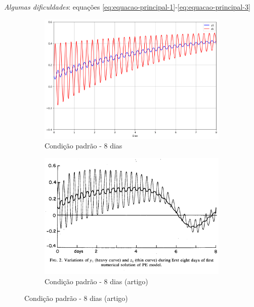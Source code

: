 \begin{frame}{\textit{Algumas dificuldades}: equações \eqref{eq:equacao-principal-1}-\eqref{eq:equacao-principal-3}}
	\begin{figure}
		\centering
		\begin{subfigure}[b]{0.45\textwidth}
			\centering
			\includegraphics[width=\textwidth]{img/p01d08.png}
			\caption{Condição padrão - 8 dias}
			\label{fig:p01d08}
		\end{subfigure}
		\hfill
		\begin{subfigure}[b]{0.45\textwidth}
			\centering
			\includegraphics[width=\textwidth]{img/p01d08rel.png}
			\caption{Condição padrão - 8 dias (artigo)}
			\label{fig:p01d08rel}
		\end{subfigure}
	\end{figure}
\end{frame}